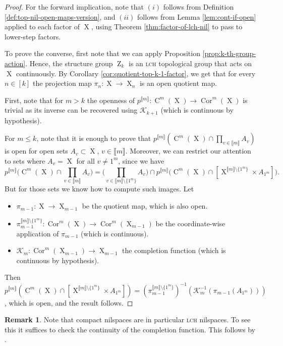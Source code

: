 \documentclass[a4paper,12pt,reqno]{amsart}
\theoremstyle{definition}
\newtheorem{remark}[theorem]{Remark}
\def\to{\rightarrow}
\newcommand*{\db}[1]{\llbracket #1\rrbracket}
\newcommand{\mc}{\mathcal}
\DeclareMathOperator{\ab}{Z}
\DeclareMathOperator{\ns}{X}
\DeclareMathOperator{\cu}{C}
\DeclareMathOperator{\cor}{Cor}
\begin{document}
\begin{proof}
For the forward implication, note that $(i)$ follows from Definition \ref{def:top-nil-open-maps-version}, and $(ii)$ follows from Lemma \ref{lem:cont-if-open} applied to each factor of $\ns$, using Theorem \ref{thm:factor-of-lch-nil} to pass to lower-step  factors. 

To prove the converse, first note that we can apply Proposition \ref{prop:k-th-group-action}. Hence, the  structure group $\ab_k$ is an \textsc{lch} topological group that acts on $\ns$ continuously. By Corollary \ref{cor:quotient-top-k-1-factor}, we get that for every $n\in[k]$ the projection map $\pi_n:\ns\to\ns_n$ is an open quotient map. 

First, note that for $m>k$ the openness of $p^{\db{m}}:\cu^m(\ns)\to \cor^m(\ns)$ is trivial as its inverse can be recovered using $\mc{K}_{k+1}$ (which is continuous by hypothesis).

For $m\le k$, note that it is enough to prove that $p^{\db{m}}(\cu^m(\ns)\cap \prod_{v\in\db{m}} A_v)$ is open for open sets $A_v\subset \ns$, $v\in \db{m}$. Moreover, we can restrict our attention to sets where $A_v=\ns$ for all $v\not=1^m$, since we have
\[
p^{\db{m}}\big(\cu^m(\ns)\cap \prod_{v\in\db{m}} A_v\big)=\big(\prod_{v\in\db{m}\setminus\{1^m\}} A_v\big)\cap p^{\db{m}}\big(\cu^m(\ns)\cap [\ns^{\db{m}\setminus\{1^m\}}\times A_{1^m}]\big).
\]
But for those sets we know how to compute such images. Let
\setlength{\leftmargini}{0.4cm}
\begin{itemize}
    \item $\pi_{m-1}:\ns\to\ns_{m-1}$ be the quotient map, which is also open.
    \item $\pi_{m-1}^{\db{m}\setminus\{1^m\}}:\cor^m(\ns)\to\cor^m(\ns_{m-1})$ be the coordinate-wise application of $\pi_{m-1}$ (which is continuous).
    \item $\mc{K}_m:\cor^m(\ns_{m-1})\to \ns_{m-1}$ the completion function (which is continuous by hypothesis).
\end{itemize}
Then $p^{\db{m}}(\cu^m(\ns)\cap [\ns^{\db{m}\setminus\{1^m\}}\times A_{1^m}]) =(\pi_{m-1}^{\db{m}\setminus\{1^m\}})^{-1}(\mc{K}_{m}^{-1}(\pi_{m-1}(A_{1^m})))$, which is open, and the result follows.
\end{proof}
\begin{remark}
Note that compact nilspaces are in particular \textsc{lch} nilspaces. To see this it suffices to check the continuity of the completion function. This follows by \cite[Lemma 2.1.12]{Cand:Notes2}.
\end{remark}
\end{document}
